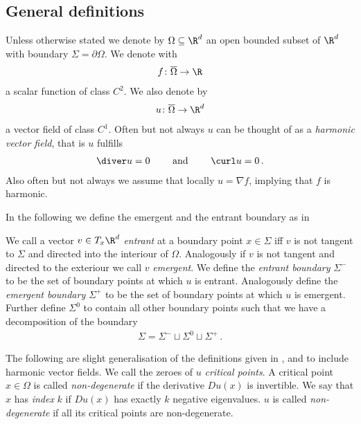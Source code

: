 \newpage


\subsection{General definitions}

Unless otherwise stated we denote by $\Omega\subseteq\R^d$ an open bounded subset of $\R^d$ with boundary $\Sigma=\partial\Omega$.
We denote with
\begin{align*}
  f\colon\overline{\Omega}\to\R
\end{align*}
a scalar function of class $C^2$. We also denote by
\begin{align*}
  u\colon\overline{\Omega}\to\R^d
\end{align*}
a vector field of class $C^1$. Often but not always $u$ can be thought of as 
a \emph{harmonic vector field}, that is $u$ fulfills
\begin{align*}
  \diver u=0 \qquad \text{ and }\qquad \curl u=0\,.
\end{align*}
Also often but not always we assume that locally $u=\nabla f$, implying that $f$ is harmonic.

In the following we define the emergent and the entrant boundary as in \cite[p.282]{Morse1970}
\begin{definition}
  We call a vector $v\in T_x\R^d$ \emph{entrant} at a boundary point $x\in\Sigma$ iff $v$ is not tangent to $\Sigma$
  and directed into the interiour of $\Omega$. Analogously if $v$ is not tangent and
  directed to the exteriour we call $v$ \emph{emergent}.
  We define the \emph{entrant boundary} $\Sigma^-$ to be the set of boundary points at which $u$ is entrant.
  Analogously define the \emph{emergent boundary} $\Sigma^+$ to be the set of boundary points at which
  $u$ is emergent.
  Further define $\Sigma^0$ to contain all other boundary points such that we have a decomposition
  of the boundary
  \begin{align*}
    \Sigma=\Sigma^-\sqcup\Sigma^0\sqcup\Sigma^+\,.
  \end{align*}
\end{definition}

The following are slight generalisation of the definitions given in \cite[p.138f]{Shelton1980}, \cite[§5]{Morse1969} and \cite[p.282f]{Morse1970}
to include harmonic vector fields.
We call the zeroes of $u$ \emph{critical points}. A critical point $x\in\Omega$ is called
\emph{non-degenerate} if the derivative $Du(x)$ is invertible. We say that $x$ has \emph{index} $k$
if $Du(x)$ has exactly $k$ negative eigenvalues. $u$ is called \emph{non-degenerate} if all its critical points
are non-degenerate.

